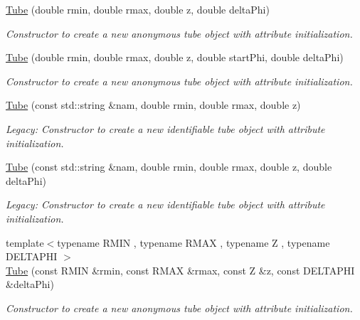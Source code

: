 \begin{DoxyCompactItemize}
\hyperlink{class_d_d4hep_1_1_geometry_1_1_tube_a27440d0dd4318c664ff4f3c4a36dd4f0}{Tube} (double rmin, double rmax, double z, double deltaPhi)
\begin{DoxyCompactList}\small\item\em Constructor to create a new anonymous tube object with attribute initialization. \item\end{DoxyCompactList}\item 
\hyperlink{class_d_d4hep_1_1_geometry_1_1_tube_a438240ff1fcab0e3e737c57d0e042fc6}{Tube} (double rmin, double rmax, double z, double startPhi, double deltaPhi)
\begin{DoxyCompactList}\small\item\em Constructor to create a new anonymous tube object with attribute initialization. \item\end{DoxyCompactList}\item 
\hyperlink{class_d_d4hep_1_1_geometry_1_1_tube_ae031124eb6636f34a07965ca7615c7fa}{Tube} (const std::string \&nam, double rmin, double rmax, double z)
\begin{DoxyCompactList}\small\item\em Legacy: Constructor to create a new identifiable tube object with attribute initialization. \item\end{DoxyCompactList}\item 
\hyperlink{class_d_d4hep_1_1_geometry_1_1_tube_a30ea96e53731054bcad134f3734aa958}{Tube} (const std::string \&nam, double rmin, double rmax, double z, double deltaPhi)
\begin{DoxyCompactList}\small\item\em Legacy: Constructor to create a new identifiable tube object with attribute initialization. \item\end{DoxyCompactList}\item 
{\footnotesize template$<$typename RMIN , typename RMAX , typename Z , typename DELTAPHI $>$ }\\\hyperlink{class_d_d4hep_1_1_geometry_1_1_tube_a31edf719befad87e4539c4964a155cd2}{Tube} (const RMIN \&rmin, const RMAX \&rmax, const Z \&z, const DELTAPHI \&deltaPhi)
\begin{DoxyCompactList}\small\item\em Constructor to create a new anonymous tube object with attribute initialization. \item\end{DoxyCompactList}\item 

\end{DoxyCompactItemize}

